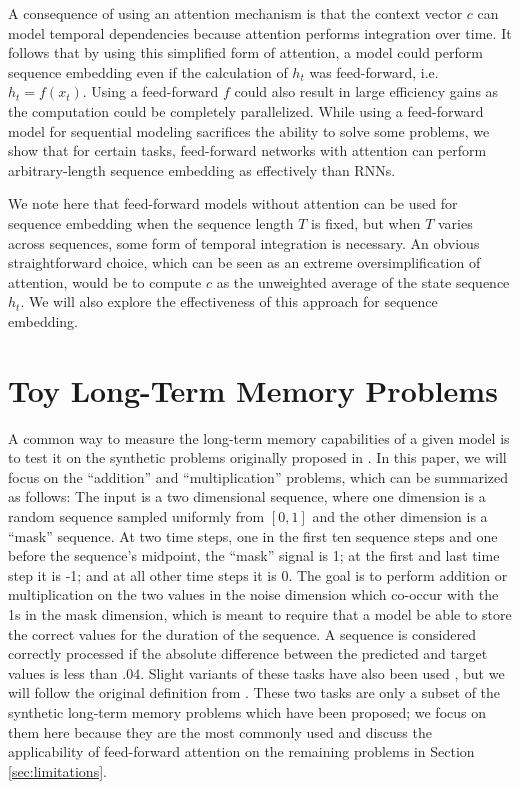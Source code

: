 \documentclass{article} %
\begin{document}
A consequence of using an attention mechanism is that the context vector $c$ can model temporal dependencies because attention performs integration over time.
It follows that by using this simplified form of attention, a model could perform sequence embedding even if the calculation of $h_t$ was feed-forward, i.e.\ $h_t = f(x_t)$.
Using a feed-forward $f$ could also result in large efficiency gains as the computation could be completely parallelized.
While using a feed-forward model for sequential modeling sacrifices the ability to solve some problems, we show that for certain tasks, feed-forward networks with attention can perform arbitrary-length sequence embedding as effectively than RNNs.

We note here that feed-forward models without attention can be used for sequence embedding when the sequence length $T$ is fixed, but when $T$ varies across sequences, some form of temporal integration is necessary.
An obvious straightforward choice, which can be seen as an extreme oversimplification of attention, would be to compute $c$ as the unweighted average of the state sequence $h_t$.
We will also explore the effectiveness of this approach for sequence embedding.

\section{Toy Long-Term Memory Problems}

A common way to measure the long-term memory capabilities of a given model is to test it on the synthetic problems originally proposed in \cite{hochreiter1997long}.
In this paper, we will focus on the ``addition'' and ``multiplication'' problems, which can be summarized as follows:
The input is a two dimensional sequence, where one dimension is a random sequence sampled uniformly from $[0, 1]$ and the other dimension is a ``mask'' sequence.
At two time steps, one in the first ten sequence steps and one before the sequence's midpoint, the ``mask'' signal is 1; at the first and last time step it is -1; and at all other time steps it is 0.
The goal is to perform addition or multiplication on the two values in the noise dimension which co-occur with the 1s in the mask dimension, which is meant to require that a model be able to store the correct values for the duration of the sequence.
A sequence is considered correctly processed if the absolute difference between the predicted and target values is less than $.04$.
Slight variants of these tasks have also been used \cite{sutskever2013importance,le2015simple,jaegar2012long,martens2011learning}, but we will follow the original definition from \cite{hochreiter1997long}.
These two tasks are only a subset of the synthetic long-term memory problems which have been proposed; we focus on them here because they are the most commonly used and discuss the applicability of feed-forward attention on the remaining problems in Section \ref{sec:limitations}.
\end{document}
